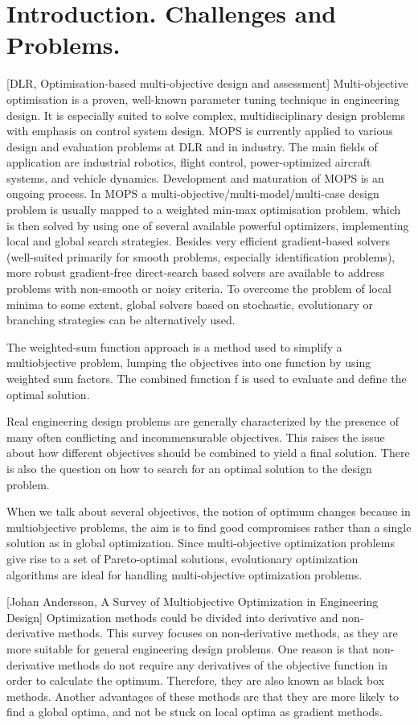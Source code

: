 \chapter{Introduction. Challenges and Problems.}

[DLR, Optimisation-based multi-objective design and assessment] 
Multi-objective optimisation is a proven, well-known parameter tuning technique in engineering design. It is especially suited 
to solve complex, multidisciplinary design problems with emphasis on control system design.
MOPS is currently applied to various design and evaluation problems at DLR and in industry. The main fields 
of application are industrial robotics, flight control, power-optimized aircraft systems, and vehicle dynamics. Development and maturation of MOPS is an ongoing process.
In MOPS a multi-objective/multi-model/multi-case design problem is usually mapped to a weighted min-max optimisation problem, which is then solved by using one of several 
available powerful optimizers, implementing local and global search strategies. Besides very efficient gradient-based solvers (well-suited primarily for smooth problems, 
especially identification problems), more robust gradient-free direct-search based solvers are available to address problems with non-smooth or noisy criteria. To overcome the 
problem of local minima to some extent, global solvers based on stochastic, evolutionary or branching strategies can be alternatively used.

The weighted-sum function approach is a method used to simplify a multiobjective problem, lumping the objectives into 
one function by using weighted sum factors. The combined function f is used to evaluate and define the optimal solution.

Real engineering design problems are generally characterized by the presence of many
often conflicting and incommensurable objectives. This raises the issue about how
different objectives should be combined to yield a final solution. There is also the
question on how to search for an optimal solution to the design problem. 

When we talk about several objectives, the notion of optimum changes because in multiobjective problems, the aim is to find good compromises rather than a single solution as in global optimization.
Since multi-objective optimization problems give rise to a set of Pareto-optimal solutions, evolutionary 
optimization algorithms are ideal for handling multi-objective optimization problems.

[Johan Andersson, A Survey of Multiobjective Optimization in Engineering Design] 
Optimization methods could be divided into derivative and non-derivative methods. This survey focuses on non-derivative methods, as they are more suitable for
general engineering design problems. One reason is that non-derivative methods do not
require any derivatives of the objective function in order to calculate the optimum.
Therefore, they are also known as black box methods. Another advantages of these
methods are that they are more likely to find a global optima, and not be stuck on local
optima as gradient methods.


